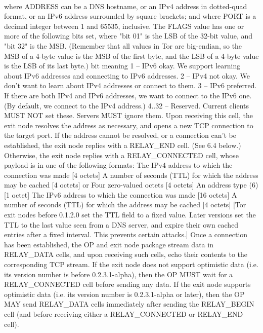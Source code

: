 \paragraph{}
where ADDRESS can be a DNS hostname, or an IPv4 address in
dotted-quad format, or an IPv6 address surrounded by square brackets;
and where PORT is a decimal integer between 1 and 65535, inclusive.
The FLAGS value has one or more of the following bits set, where
"bit 01" is the LSB of the 32-bit value, and "bit 32" is the MSB.
(Remember that all values in Tor are big-endian, so
the MSB of a 4-byte value is the MSB of the first byte, and the LSB
of a 4-byte value is the LSB of its last byte.)
bit meaning
1 -- IPv6 okay. We support learning about IPv6 addresses and
connecting to IPv6 addresses.
2 -- IPv4 not okay. We don't want to learn about IPv4 addresses
or connect to them.
3 -- IPv6 preferred. If there are both IPv4 and IPv6 addresses,
we want to connect to the IPv6 one. (By default, we connect
to the IPv4 address.)
4..32 -- Reserved. Current clients MUST NOT set these. Servers
MUST ignore them.
Upon receiving this cell, the exit node resolves the address as
necessary, and opens a new TCP connection to the target port. If the
address cannot be resolved, or a connection can't be established, the
exit node replies with a RELAY_END cell. (See 6.4 below.)
Otherwise, the exit node replies with a RELAY_CONNECTED cell, whose
payload is in one of the following formats:
The IPv4 address to which the connection was made [4 octets]
A number of seconds (TTL) for which the address may be cached [4 octets]
or
Four zero-valued octets [4 octets]
An address type (6) [1 octet]
The IPv6 address to which the connection was made [16 octets]
A number of seconds (TTL) for which the address may be cached [4 octets]
[Tor exit nodes before 0.1.2.0 set the TTL field to a fixed value. Later
versions set the TTL to the last value seen from a DNS server, and expire
their own cached entries after a fixed interval. This prevents certain
attacks.]
Once a connection has been established, the OP and exit node
package stream data in RELAY_DATA cells, and upon receiving such
cells, echo their contents to the corresponding TCP stream.
If the exit node does not support optimistic data (i.e. its
version number is before 0.2.3.1-alpha), then the OP MUST wait
for a RELAY_CONNECTED cell before sending any data. If the exit
node supports optimistic data (i.e. its version number is
0.2.3.1-alpha or later), then the OP MAY send RELAY_DATA cells
immediately after sending the RELAY_BEGIN cell (and before
receiving either a RELAY_CONNECTED or RELAY_END cell).
